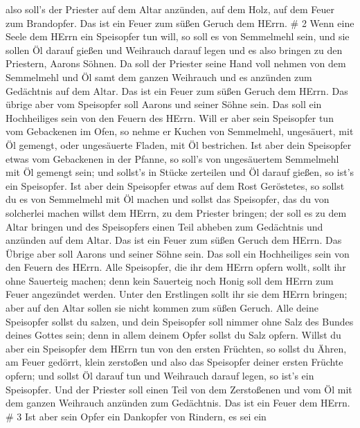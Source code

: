 also soll's der Priester auf dem Altar anzünden, auf dem Holz, auf dem
Feuer zum Brandopfer. Das ist ein Feuer zum süßen Geruch dem HErrn. \# 2
 Wenn eine Seele dem HErrn ein Speisopfer tun will, so soll
es von Semmelmehl sein, und sie sollen Öl darauf gießen und Weihrauch
darauf legen  und es also bringen zu den Priestern, Aarons
Söhnen. Da soll der Priester seine Hand voll nehmen von dem Semmelmehl
und Öl samt dem ganzen Weihrauch und es anzünden zum Gedächtnis auf dem
Altar. Das ist ein Feuer zum süßen Geruch dem HErrn.  Das
übrige aber vom Speisopfer soll Aarons und seiner Söhne sein. Das soll
ein Hochheiliges sein von den Feuern des HErrn.  Will er
aber sein Speisopfer tun vom Gebackenen im Ofen, so nehme er Kuchen von
Semmelmehl, ungesäuert, mit Öl gemengt, oder ungesäuerte Fladen, mit Öl
bestrichen.  Ist aber dein Speisopfer etwas vom Gebackenen
in der Pfanne, so soll's von ungesäuertem Semmelmehl mit Öl gemengt
sein;  und sollst's in Stücke zerteilen und Öl darauf
gießen, so ist's ein Speisopfer.  Ist aber dein Speisopfer
etwas auf dem Rost Geröstetes, so sollst du es von Semmelmehl mit Öl
machen  und sollst das Speisopfer, das du von solcherlei
machen willst dem HErrn, zu dem Priester bringen; der soll es zu dem
Altar bringen  und des Speisopfers einen Teil abheben zum
Gedächtnis und anzünden auf dem Altar. Das ist ein Feuer zum süßen
Geruch dem HErrn.  Das Übrige aber soll Aarons und seiner
Söhne sein. Das soll ein Hochheiliges sein von den Feuern des HErrn.
 Alle Speisopfer, die ihr dem HErrn opfern wollt, sollt ihr
ohne Sauerteig machen; denn kein Sauerteig noch Honig soll dem HErrn zum
Feuer angezündet werden.  Unter den Erstlingen sollt ihr
sie dem HErrn bringen; aber auf den Altar sollen sie nicht kommen zum
süßen Geruch.  Alle deine Speisopfer sollst du salzen, und
dein Speisopfer soll nimmer ohne Salz des Bundes deines Gottes sein;
denn in allem deinem Opfer sollst du Salz opfern.  Willst
du aber ein Speisopfer dem HErrn tun von den ersten Früchten, so sollst
du Ähren, am Feuer gedörrt, klein zerstoßen und also das Speisopfer
deiner ersten Früchte opfern;  und sollst Öl darauf tun und
Weihrauch darauf legen, so ist's ein Speisopfer.  Und der
Priester soll einen Teil von dem Zerstoßenen und vom Öl mit dem ganzen
Weihrauch anzünden zum Gedächtnis. Das ist ein Feuer dem HErrn. \# 3
 Ist aber sein Opfer ein Dankopfer von Rindern, es sei ein
